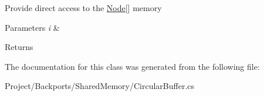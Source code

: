 Provide direct access to the \hyperlink{struct_shared_memory_1_1_circular_buffer_1_1_node}{Node}\mbox{[}\mbox{]} memory 


\begin{DoxyParams}{Parameters}
{\em i} & \\
\hline
\end{DoxyParams}
\begin{DoxyReturn}{Returns}

\end{DoxyReturn}


The documentation for this class was generated from the following file\+:\begin{DoxyCompactItemize}
\item 
Project/\+Backports/\+Shared\+Memory/Circular\+Buffer.\+cs\end{DoxyCompactItemize}
